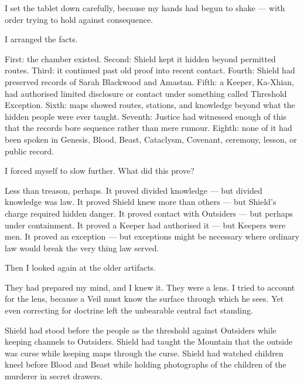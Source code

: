 \ornament


I set the tablet down carefully, because my hands had begun to shake --- with order trying to hold against consequence.\par

I arranged the facts.\par

First: the chamber existed. Second: Shield kept it hidden beyond permitted routes. Third: it continued past old proof into recent contact. Fourth: Shield had preserved records of Sarah Blackwood and Amastan. Fifth: a Keeper, Ka-Xhian, had authorised limited disclosure or contact under something called Threshold Exception. Sixth: maps showed routes, stations, and knowledge beyond what the hidden people were ever taught. Seventh: Justice had witnessed enough of this that the records bore sequence rather than mere rumour. Eighth: none of it had been spoken in Genesis, Blood, Beast, Cataclysm, Covenant, ceremony, lesson, or public record.\par

I forced myself to slow further. What did this prove?\par

Less than treason, perhaps. It proved divided knowledge --- but divided knowledge was law. It proved Shield knew more than others --- but Shield's charge required hidden danger. It proved contact with Outsiders --- but perhaps under containment. It proved a Keeper had authorised it --- but Keepers were men. It proved an exception --- but exceptions might be necessary where ordinary law would break the very thing law served.\par

Then I looked again at the older artifacts.\par

They had prepared my mind, and I knew it. They were a lens. I tried to account for the lens, because a Veil must know the surface through which he sees. Yet even correcting for doctrine left the unbearable central fact standing.\par

Shield had stood before the people as the threshold against Outsiders while keeping channels to Outsiders. Shield had taught the Mountain that the outside was curse while keeping maps through the curse. Shield had watched children kneel before Blood and Beast while holding photographs of the children of the murderer in secret drawers.\par


